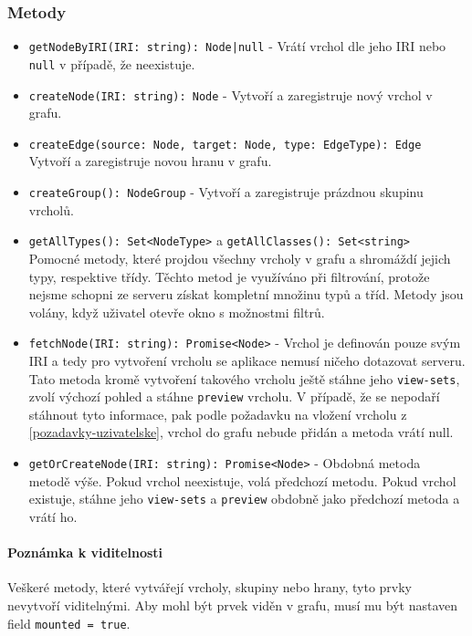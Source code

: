 \subsubsection*{Metody}
\begin{itemize}
  \item \texttt{getNodeByIRI(IRI: string): Node|null} - Vrátí vrchol dle jeho IRI nebo \texttt{null} v případě, že neexistuje.

  \item \texttt{createNode(IRI: string): Node} - Vytvoří a zaregistruje nový vrchol v grafu.
  \item \texttt{createEdge(source: Node, target: Node, type: EdgeType): Edge}\mbox{}\\Vytvoří a zaregistruje novou hranu v grafu.
  \item \texttt{createGroup(): NodeGroup} - Vytvoří a zaregistruje prázdnou skupinu vrcholů.

  \item \texttt{getAllTypes(): Set<NodeType>} a \texttt{getAllClasses(): Set<string>}\mbox{}\\Pomocné metody, které projdou všechny vrcholy v grafu a shromáždí jejich typy, respektive třídy. Těchto metod je využíváno při filtrování, protože nejsme schopni ze serveru získat kompletní množinu typů a tříd. Metody jsou volány, když uživatel otevře okno s možnostmi filtrů.

  \item \texttt{fetchNode(IRI: string): Promise<Node>} - Vrchol je definován pouze svým IRI a tedy pro vytvoření vrcholu se aplikace nemusí ničeho dotazovat serveru. Tato metoda kromě vytvoření takového vrcholu ještě stáhne jeho \texttt{view-sets}, zvolí výchozí pohled a stáhne \texttt{preview} vrcholu. V případě, že se nepodaří stáhnout tyto informace, pak podle požadavku na vložení vrcholu z \ref{pozadavky-uzivatelske}, vrchol do grafu nebude přidán a metoda vrátí null.

  \item \texttt{getOrCreateNode(IRI: string): Promise<Node>} - Obdobná metoda \\metodě výše. Pokud vrchol neexistuje, volá předchozí metodu. Pokud vrchol existuje, stáhne jeho \texttt{view-sets} a \texttt{preview} obdobně jako předchozí metoda a vrátí ho.
\end{itemize}

\paragraph{Poznámka k viditelnosti} Veškeré metody, které vytvářejí vrcholy, skupiny nebo hrany, tyto prvky nevytvoří viditelnými. Aby mohl být prvek viděn v grafu, musí mu být nastaven field \texttt{mounted = true}.

